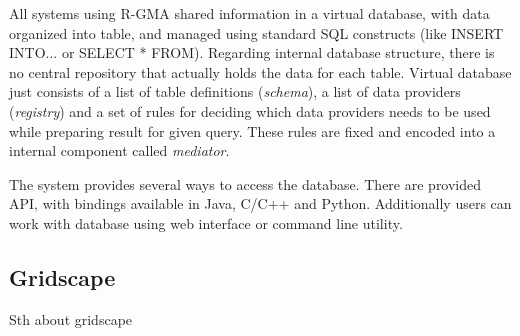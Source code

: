 All systems using R-GMA shared information in a virtual database, with data organized into table, and managed using standard SQL constructs (like INSERT INTO... or SELECT * FROM). Regarding internal database structure, there is no central repository that actually holds the data for each table. Virtual database just consists of a list of table definitions (\emph{schema}), a list of data providers (\emph{registry}) and a set of rules for deciding which data providers needs to be used while preparing result for given query. These rules are fixed and encoded into a internal component called \emph{mediator}.

The system provides several ways to access the database. There are provided API, with bindings available in Java, C/C++ and Python. Additionally users can work with database using web interface or command line utility.




\subsection{Gridscape}

Sth about gridscape \cite{GRIDSCAPE1, GRIDSCAPE2, GRIDSCAPE3}